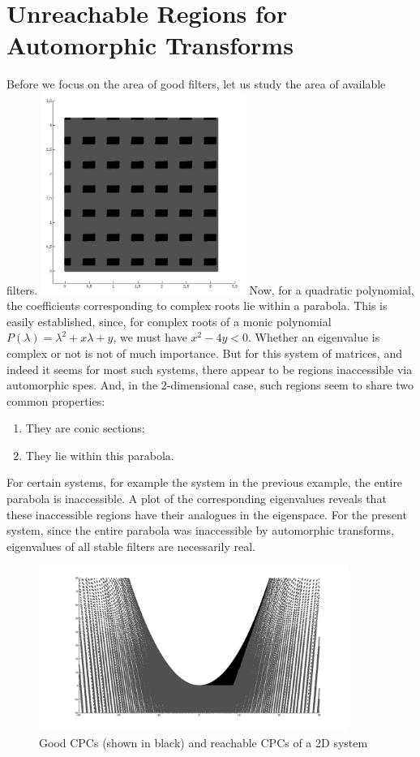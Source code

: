\section{Unreachable Regions for Automorphic Transforms}
\begin{multicols}{2}
\label{sec:un}
Before we focus on the area of good filters, let us study the area of 
available filters.
\includegraphics[width=0.5\textwidth]{theta_s_in_uns.jpg}
Now, for a quadratic polynomial, the coefficients corresponding to
complex roots lie within a parabola. This is easily established, 
since, for complex roots of a monic polynomial 
$P(\lambda) = \lambda^2 + x\lambda + y$, we must have
$x^2 - 4y < 0$. Whether an eigenvalue is complex or not is not of
much importance. But for this system of matrices, and indeed it seems for
most such systems, there appear to be regions inaccessible via 
automorphic \glspl{spe}. And, in the 2-dimensional case, such 
regions seem to share two common properties: 
\begin{enumerate}
\item They are conic sections;
\item They lie within this parabola.
\end{enumerate}
For certain systems, for example the system in the previous example,
the entire parabola is inaccessible. A plot of the corresponding
eigenvalues reveals that these inaccessible regions have their 
analogues in the eigenspace. For the present system, since the entire
parabola was inaccessible by automorphic transforms, eigenvalues of all
stable filters are necessarily real.
\begin{figure}
\centering
\includegraphics[width=0.9\textwidth]{s_in_uns.jpg}
\caption{Good CPCs (shown in black) and reachable CPCs of a 2D system}
\label{fig:s_vs_us}
\end{figure}


\end{multicols}
